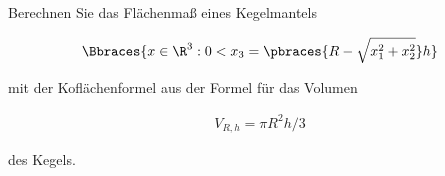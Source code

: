 
\begin{exercise}

Berechnen Sie das Flächenmaß eines Kegelmantels

\begin{align*}
    \Bbraces
    {
        x \in \R^3:
        0 < x_3 = \pbraces{R - \sqrt{x_1^2 + x_2^2}} h
    }
\end{align*}

mit der Koflächenformel aus der Formel für das Volumen

\begin{align*}
    V_{R, h} = \pi R^2 h / 3
\end{align*}

des Kegels.

\end{exercise}



